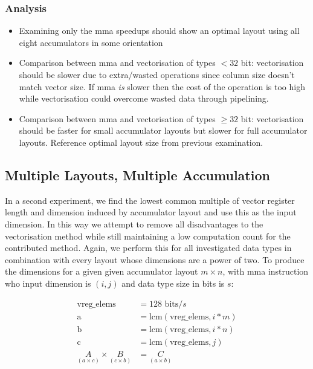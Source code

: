 \documentclass[\main/thesis.tex]{subfiles}
\begin{document}
\subsubsection{Analysis}
\label{sec:mlsaAnalysis}
\begin{itemize}
  \item Examining only the mma speedups should show an optimal layout using all eight accumulators in some orientation
  \item
    Comparison between mma and vectorisation of types $<32$ bit: vectorisation should be slower due to extra/wasted operations since column size doesn't match vector size.
    If mma \emph{is} slower then the cost of the operation is too high while vectorisation could overcome wasted data through pipelining.
  \item
    Comparison between mma and vectorisation of types $\geq 32$ bit: vectorisation should be faster for small accumulator layouts but slower for full accumulator layouts.
    Reference optimal layout size from previous examination.
\end{itemize}

\subsection{Multiple Layouts, Multiple Accumulation}
\label{sec:mlma}
In a second experiment, we find the lowest common multiple of vector register length and dimension induced by accumulator layout and use this as the input dimension.
In this way we attempt to remove all disadvantages to the \gls{vectorisation} method while still maintaining a low computation count for the contributed method.
Again, we perform this for all investigated data types in combination with every layout whose dimensions are a power of two.
To produce the dimensions for a given given accumulator layout $m \times n$, with \gls{mma} instruction who input dimension is $(i, j)$ and data type size in bits is $s$:

\begin{equation}
  \begin{split}
    \text{vreg\_elems} &= 128\text{ bits} / s\\
    \text{a} &= \text{lcm}(\text{vreg\_elems}, i * m)\\
    \text{b} &= \text{lcm}(\text{vreg\_elems}, i * n)\\
    \text{c} &= \text{lcm}(\text{vreg\_elems}, j)\\
    \underset{(a \times c)}{A} \times \underset{(c \times b)}{B} &= \underset{(a \times b)}{C}\\
  \end{split}
\end{equation}
\end{document}
